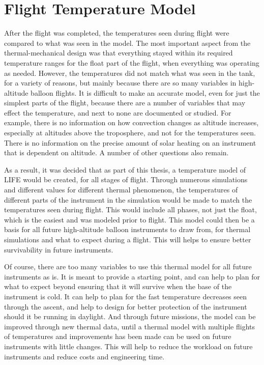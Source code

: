 \section{Flight Temperature Model}
After the flight was completed, the temperatures seen during flight were compared to what was seen in the model. The most important aspect from the thermal-mechanical design was that everything stayed within its required temperature ranges for the float part of the flight, when everything was operating as needed. However, the temperatures did not match what was seen in the tank, for a variety of reasons, but mainly because there are so many variables in high-altitude balloon flights. It is difficult to make an accurate model, even for just the simplest parts of the flight, because there are a number of variables that may effect the temperature, and next to none are documented or studied. For example, there is no information on how convection changes as altitude increases, especially at altitudes above the troposphere, and not for the temperatures seen. There is no information on the precise amount of solar heating on an instrument that is dependent on altitude. A number of other questions also remain.

As a result, it was decided that as part of this thesis, a temperature model of LIFE would be created, for all stages of flight. Through numerous simulations and different values for different thermal phenomenon, the temperatures of different parts of the instrument in the simulation would be made to match the temperatures seen during flight. This would include all phases, not just the float, which is the easiest and was modeled prior to flight. This model could then be a basis for all future high-altitude balloon instruments to draw from, for thermal simulations and what to expect during a flight. This will helps to ensure better survivability in future instruments.

Of course, there are too many variables to use this thermal model for all future instruments as is. It is meant to provide a starting point, and can help to plan for what to expect beyond ensuring that it will survive when the base of the instrument is cold. It can help to plan for the fast temperature decreases seen through the ascent, and help to design for better protection of the instrument should it be running in daylight. And through future missions, the model can be improved through new thermal data, until a thermal model with multiple flights of temperatures and improvements has been made can be used on future instruments with little changes. This will help to reduce the workload on future instruments and reduce costs and engineering time. 


